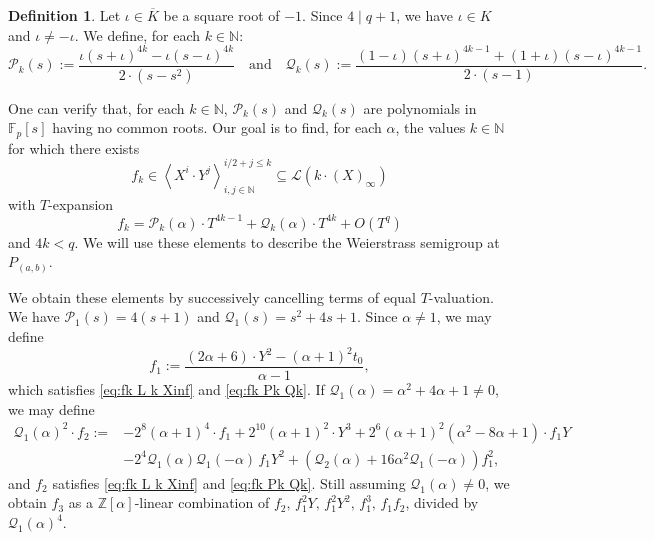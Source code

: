 \documentclass[12pt]{amsart}
\theoremstyle{remark}
\theoremstyle{definition}
\newtheorem{defn}[theorem]{Definition}
\newcommand{\coloneqq}{\mathrel{:=}}
\begin{document}
\begin{defn}
    Let $\iota \in \overline{K}$ be a square root of $-1$. Since $4 \mid q+1$,
    we have $\iota \in K$ and $\iota \neq -\iota$. We define, for each
    $k \in \mathbb{N}$:
    \[
    \mathcal{P}_{k}(s) \coloneqq
    \frac{\iota(s+\iota)^{4k} - \iota(s-\iota)^{4k}}{2\cdot(s - s^{2})}
    \quad \text{and} \quad
    \mathcal{Q}_{k}(s) \coloneqq
    \frac{(1-\iota)(s+\iota)^{4k-1} + (1+\iota)(s-\iota)^{4k-1}}{2\cdot(s-1)}.
    \]
\end{defn}

One can verify that, for each $k \in \mathbb{N}$, $\mathcal{P}_{k}(s)$ and
$\mathcal{Q}_{k}(s)$ are polynomials in $\mathbb{F}_{p}[s]$ having no common
roots. Our goal is to find, for each $\alpha$, the values $k \in \mathbb{N}$
for which there exists
\begin{equation}
    f_{k} \in
    \left\langle X^{i} \cdot Y^{j} \right\rangle_{i,j \in \mathbb{N}}^{i/2+j \le k}
    \subseteq \mathcal{L}\!\left(k \cdot (X)_{\infty}\right)
    \label{eq:fk L k Xinf}
\end{equation}
with $T$-expansion
\begin{equation}
    f_{k} = \mathcal{P}_{k}(\alpha) \cdot T^{4k-1}
           + \mathcal{Q}_{k}(\alpha) \cdot T^{4k}
           + O\!\left(T^{q}\right)
    \label{eq:fk Pk Qk}
\end{equation}
and $4k < q$. We will use these elements to describe the Weierstrass semigroup
at $P_{(a,b)}$.

We obtain these elements by successively cancelling terms of equal
$T$-valuation. We have $\mathcal{P}_1(s) = 4(s+1)$ and
$\mathcal{Q}_1(s) = s^2 + 4s + 1$. Since $\alpha \neq 1$, we may define
\[
    f_{1} \coloneqq
    \frac{(2\alpha+6) \cdot Y^{2} - (\alpha+1)^{2} t_{0}}{\alpha - 1},
\]
which satisfies \eqref{eq:fk L k Xinf} and \eqref{eq:fk Pk Qk}. If
$\mathcal{Q}_{1}(\alpha) = \alpha^{2} + 4\alpha + 1 \neq 0$, we may define
\begin{align*}
    \mathcal{Q}_{1}(\alpha)^{2} \cdot f_{2}
    \coloneqq{} &
    -2^{8}(\alpha+1)^{4} \cdot f_{1}
    + 2^{10}(\alpha+1)^{2} \cdot Y^{3}
    + 2^{6}(\alpha+1)^{2}(\alpha^{2}-8\alpha+1) \cdot f_{1}Y \\
    &- 2^{4}\mathcal{Q}_{1}(\alpha)\mathcal{Q}_{1}(-\alpha)\,f_{1}Y^{2}
    + \left(\mathcal{Q}_{2}(\alpha) + 16\alpha^{2}\mathcal{Q}_{1}(-\alpha)\right)f_{1}^{2},
\end{align*}
and $f_2$ satisfies \eqref{eq:fk L k Xinf} and \eqref{eq:fk Pk Qk}. Still
assuming $\mathcal{Q}_{1}(\alpha) \neq 0$, we obtain $f_{3}$ as a
$\mathbb{Z}[\alpha]$-linear combination of
$f_{2},\, f_{1}^{2}Y,\, f_{1}^{2}Y^{2},\, f_{1}^{3},\, f_{1}f_{2}$,
divided by $\mathcal{Q}_{1}(\alpha)^{4}$.
\end{document}
